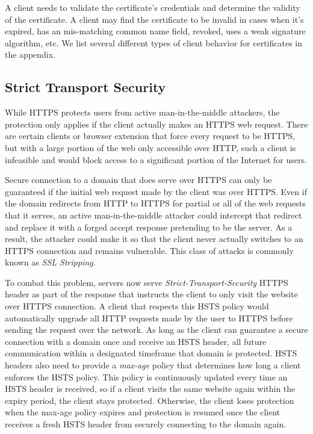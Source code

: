 A client needs to validate the certificate's credentials and
determine the validity of the certificate. A client may find the certificate to be
invalid in cases when it's expired, has an mis-matching common name field, revoked,
uses a weak signature algorithm, etc. We list several different types of client
behavior for certificates in the appendix.

\subsection{Strict Transport Security}
While HTTPS protects users from active man-in-the-middle attackers, the
protection only applies if the client actually makes an HTTPS web request.
There are certain clients or browser extension that force every request to be
HTTPS, but with a large portion of the web only accessible over HTTP, such a
client is infeasible and would block access to a significant portion of the
Internet for users.

Secure connection to a domain that does serve over HTTPS can only be guaranteed
if the initial web request made by the client was over HTTPS. Even if the
domain redirects from HTTP to HTTPS for partial or all of the web requests
that it serves, an active man-in-the-middle attacker could intercept that
redirect and replace it with a forged accept response pretending to be the
server. As a result, the attacker could make it so that the client never
actually switches to an HTTPS connection and remains vulnerable. This class of
attacks is commonly known as \emph{SSL Stripping}.

To combat this problem, servers now serve \emph{Strict-Transport-Security}
HTTPS header as part of the response that instructs the client to only visit
the website over HTTPS connection. A client that respects this HSTS policy
would automatically upgrade all HTTP requests made by the user to HTTPS before
sending the request over the network. As long as the client can guarantee a
secure connection with a domain once and receive an HSTS header, all future
communication within a designated timeframe that domain is protected. HSTS
headers also need to provide a \emph{max-age} policy that determines how long
a client enforces the HSTS policy. This policy is continuously updated every
time an HSTS header is received, so if a client visits the same website again
within the expiry period, the client stays protected. Otherwise, the client
loses protection when the max-age policy expires and protection is resumed once
the client receives a fresh HSTS header from securely connecting to the domain
again.

